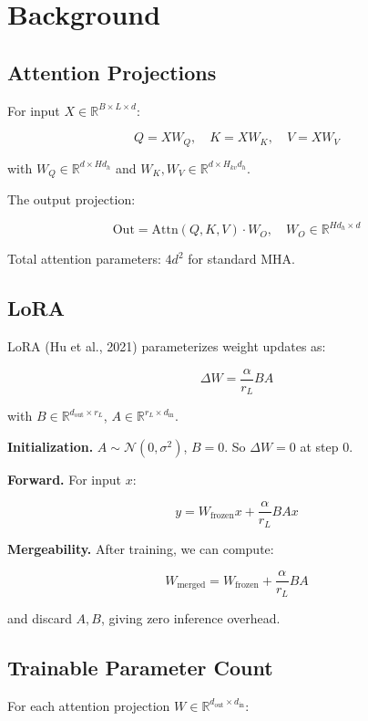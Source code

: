 \section{Background}

\subsection{Attention Projections}

For input $X \in \mathbb{R}^{B \times L \times d}$:

\[
Q = X W_Q, \quad K = X W_K, \quad V = X W_V
\tag{3.1}
\]

with $W_Q \in \mathbb{R}^{d \times H d_h}$ and $W_K, W_V \in \mathbb{R}^{d \times H_{kv} d_h}$.

The output projection:

\[
\text{Out} = \text{Attn}(Q, K, V) \cdot W_O, \quad W_O \in \mathbb{R}^{H d_h \times d}
\tag{3.2}
\]

Total attention parameters: $4 d^2$ for standard MHA.

\subsection{LoRA}

LoRA (Hu et al., 2021) parameterizes weight updates as:

\[
\Delta W = \frac{\alpha}{r_L} B A
\tag{3.3}
\]

with $B \in \mathbb{R}^{d_\text{out} \times r_L}$, $A \in \mathbb{R}^{r_L \times d_\text{in}}$.

\textbf{Initialization.} $A \sim \mathcal{N}(0, \sigma^2)$, $B = 0$. So 
$\Delta W = 0$ at step 0.

\textbf{Forward.} For input $x$:

\[
y = W_\text{frozen} x + \frac{\alpha}{r_L} B A x
\tag{3.4}
\]

\textbf{Mergeability.} After training, we can compute:

\[
W_\text{merged} = W_\text{frozen} + \frac{\alpha}{r_L} B A
\tag{3.5}
\]

and discard $A, B$, giving zero inference overhead.

\subsection{Trainable Parameter Count}

For each attention projection $W \in \mathbb{R}^{d_\text{out} \times d_\text{in}}$:

